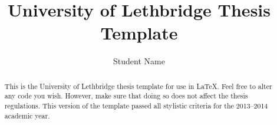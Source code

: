 \documentclass[math , phd , 12pt , final]{uleththesis}
\title{University of Lethbridge Thesis Template}
\author{Student Name}
\begin{document}
\frontmatter
 
\ulethtitle
\ulethapproval

\dedication{
  This is where the dedication goes. It is normally quite short. (This is an optional section)
} %

\begin{abstract}
 This is the University of Lethbridge thesis template for use in \LaTeX. Feel free to alter any code you wish. However, make sure that doing so does not affect the thesis regulations. This version of the template passed all stylistic criteria for the 2013--2014 academic year.
\end{abstract}


\tableofcontents
\listoftables
\listoffigures

\mainmatter




\clearpage
{}

\appendix


\end{document}

